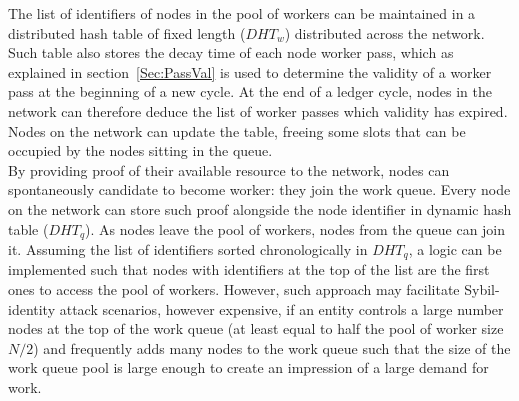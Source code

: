 The list of identifiers of nodes in the pool of workers can be maintained in a distributed hash table of fixed length ($DHT_w$) distributed across the network. Such table also stores the decay time of each node worker pass, which as explained in section~\ref{Sec:PassVal} is used to determine the validity of a worker pass at the beginning of a new cycle. At the end of a ledger cycle, nodes in the network can therefore deduce the list of worker passes which validity has expired. Nodes on the network can update the table, freeing some slots that can be occupied by the nodes sitting in the queue. \\

By providing proof of their available resource to the network, nodes can spontaneously candidate to become worker: they join the work queue. Every node on the network can store such proof alongside the node identifier in dynamic hash table ($DHT_q$). As nodes leave the pool of workers, nodes from the queue can join it. Assuming the list of identifiers sorted chronologically in $DHT_q$, a logic can be implemented such that nodes with identifiers at the top of the list are the first ones to access the pool of workers. However, such approach may facilitate Sybil-identity attack scenarios, however expensive, if an entity controls a large number nodes at the top of the work queue (at least equal to half the pool of worker size $N/2$) and frequently adds many nodes to the work queue such that the size of the work queue pool is large enough to create an impression of a large demand for work.\\


